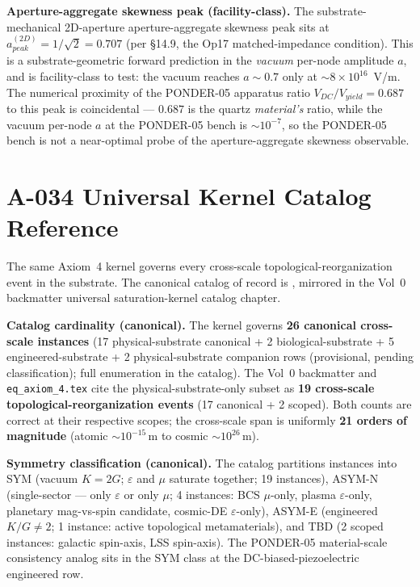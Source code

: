 \textbf{Aperture-aggregate skewness peak (facility-class).} The substrate-mechanical 2D-aperture aperture-aggregate skewness peak sits at $a^{(2D)}_{peak} = 1/\sqrt{2} = 0.707$ (per  \S 14.9, the Op17 matched-impedance condition). This is a substrate-geometric forward prediction in the \emph{vacuum} per-node amplitude $a$, and is facility-class to test: the vacuum reaches $a \sim 0.7$ only at $\sim 8\times10^{16}$~V/m. The numerical proximity of the PONDER-05 apparatus ratio $V_{DC}/V_{yield} = 0.687$ to this peak is coincidental --- $0.687$ is the quartz \emph{material's} ratio, while the vacuum per-node $a$ at the PONDER-05 bench is $\sim 10^{-7}$, so the PONDER-05 bench is not a near-optimal probe of the aperture-aggregate skewness observable.

\section{A-034 Universal Kernel Catalog Reference}
\label{sec:vol9_a034_catalog}

The same Axiom~4 kernel governs every cross-scale topological-reorganization event in the substrate. The canonical catalog of record is , mirrored in the Vol~0 backmatter universal saturation-kernel catalog chapter.

\textbf{Catalog cardinality (canonical).} The kernel governs \textbf{26 canonical cross-scale instances} (17 physical-substrate canonical + 2 biological-substrate + 5 engineered-substrate + 2 physical-substrate companion rows (provisional, pending classification); full enumeration in the catalog). The Vol~0 backmatter and \texttt{eq\_axiom\_4.tex} cite the physical-substrate-only subset as \textbf{19 cross-scale topological-reorganization events} (17 canonical + 2 scoped). Both counts are correct at their respective scopes; the cross-scale span is uniformly \textbf{21 orders of magnitude} (atomic $\sim 10^{-15}\,\text{m}$ to cosmic $\sim 10^{26}\,\text{m}$).

\textbf{Symmetry classification (canonical).} The catalog partitions instances into SYM (vacuum $K = 2G$; $\varepsilon$ and $\mu$ saturate together; 19 instances), ASYM-N (single-sector --- only $\varepsilon$ or only $\mu$; 4 instances: BCS $\mu$-only, plasma $\varepsilon$-only, planetary mag-vs-spin candidate, cosmic-DE $\varepsilon$-only), ASYM-E (engineered $K/G \neq 2$; 1 instance: active topological metamaterials), and TBD (2 scoped instances: galactic spin-axis, LSS spin-axis). The PONDER-05 material-scale consistency analog sits in the SYM class at the DC-biased-piezoelectric engineered row.

